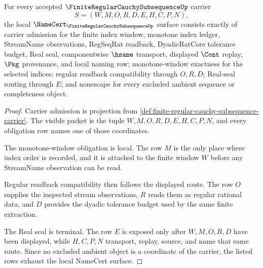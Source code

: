\begin{theorem}
\label{thm:finite-regular-cauchy-subsequence-namecert-obligations}
For every accepted $\FiniteRegularCauchySubsequenceUp$ carrier
$$
S=(W,M,O,R,D,E,H,C,P,N),
$$
the local $\NameCert_{\FiniteRegularCauchySubsequenceUp}$ surface consists exactly of carrier admission for the finite index window, monotone index ledger, StreamName observations, RegSeqRat readback, DyadicRatCore tolerance budget, Real seal, componentwise $\hsame$ transport, displayed $\Cont$ replay, $\Pkg$ provenance, and local naming row; monotone-window exactness for the selected indices; regular readback compatibility through $O,R,D$; Real-seal routing through $E$; and nonescape for every excluded ambient sequence or completeness object.
\end{theorem}
\begin{proof}
Carrier admission is projection from \autoref{def:finite-regular-cauchy-subsequence-carrier}. The visible packet is the tuple $W,M,O,R,D,E,H,C,P,N$, and every obligation row names one of those coordinates.

The monotone-window obligation is local. The row $M$ is the only place where index order is recorded, and it is attached to the finite window $W$ before any StreamName observation can be read.

Regular readback compatibility then follows the displayed route. The row $O$ supplies the inspected stream observations, $R$ reads them as regular rational data, and $D$ provides the dyadic tolerance budget used by the same finite extraction.

The Real seal is terminal. The row $E$ is exposed only after $W,M,O,R,D$ have been displayed, while $H,C,P,N$ transport, replay, source, and name that same route. Since no excluded ambient object is a coordinate of the carrier, the listed rows exhaust the local NameCert surface.
\end{proof}

